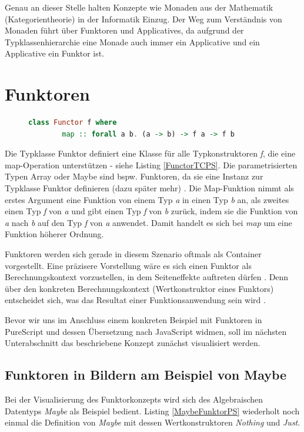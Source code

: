 \documentclass[
12pt,
ngerman,
oneside]
{scrbook} %
\begin{document}
Genau an dieser Stelle halten Konzepte wie Monaden aus der Mathematik (Kategorientheorie) in der Informatik Einzug. Der Weg zum Verständnis von Monaden führt über Funktoren und Applicatives, da aufgrund der Typklassenhierarchie eine Monade auch immer ein Applicative und ein Applicative ein Funktor ist. 

\section{Funktoren}
\begin{figure}
	\begin{lstlisting}[aboveskip=-1em, language=purescript, caption=Typklasse Functor, label=FunctorTCPS]
	class Functor f where
		map :: forall a b. (a -> b) -> f a -> f b
	\end{lstlisting}
\end{figure}

Die Typklasse Funktor definiert eine Klasse für alle Typkonstruktoren \emph{f}, die eine map-Operation unterstützen - siehe Listing \ref{FunctorTCPS}. Die parametrisierten Typen Array oder Maybe sind bspw. Funktoren, da sie eine Instanz zur Typklasse Funktor definieren (dazu später mehr) \cite[][S. 29, 33]{Freeman17}. Die Map-Funktion nimmt als erstes Argument eine Funktion von einem Typ \emph{a} in einen Typ \emph{b} an, als zweites einen Typ \emph{f} von \emph{a} und gibt einen Typ \emph{f} von \emph{b} zurück, indem sie die Funktion von \emph{a} nach \emph{b} auf den Typ \emph{f} von \emph{a} anwendet. Damit handelt es sich bei \emph{map} um eine Funktion höherer Ordnung. 

Funktoren werden sich gerade in diesem Szenario oftmals als Container vorgestellt. Eine präzisere Vorstellung wäre es sich einen Funktor als Berechnungskontext vorzustellen, in dem Seiteneffekte auftreten dürfen \cite[Kap. Functors, Applicative Functors and Monoids, Abschn. Functors redux]{Haskell11}. Denn über den konkreten Berechnungskontext (Wertkonstruktor eines Funktors) entscheidet sich, was das Resultat einer Funktionsanwendung sein wird \cite{AdityaBhargava13}.

Bevor wir uns im Anschluss einem konkreten Beispiel mit Funktoren in PureScript und dessen Übersetzung nach JavaScript widmen, soll im nächsten Unterabschnitt das beschriebene Konzept zunächst visualisiert werden.

\subsection{Funktoren in Bildern am Beispiel von Maybe}
Bei der Visualisierung des Funktorkonzepts wird sich des Algebraischen Datentyps \emph{Maybe} als Beispiel bedient. Listing \ref{MaybeFunktorPS} wiederholt noch einmal die Definition von \emph{Maybe} mit dessen Wertkonstruktoren \emph{Nothing} und \emph{Just}.
\end{document}
